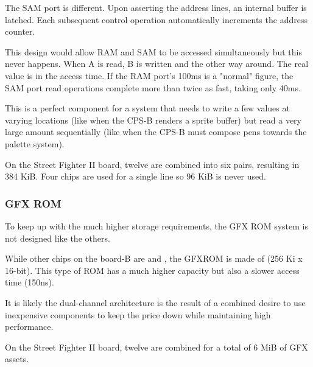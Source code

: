 The SAM port is different. Upon asserting the address lines, an internal buffer is latched. Each subsequent control operation automatically increments the address counter.

This design would allow RAM and SAM to be accessed simultaneously but this never happens. When A is read, B is written and the other way around. The real value is in the access time. If the RAM port's 100ms is a "normal" figure, the SAM port read operations complete more than twice as fast, taking only 40ms. 

 This is a perfect component for a system that needs to write a few values at varying locations (like when the CPS-B renders a sprite buffer) but read a very large amount sequentially (like when the CPS-B must compose pens towards the palette system).

 On the Street Fighter II board, twelve  are combined into six pairs, resulting in 384 KiB. Four chips are used for a single line so 96 KiB is never used.







\subsubsection{GFX ROM}
To keep up with the much higher storage requirements, the GFX ROM system is not designed like the others. 

While other chips on the board-B are  and , the GFXROM is made of  (256 Ki x 16-bit). This type of ROM has a much higher capacity but also a slower access time (150ns). 

It is likely the dual-channel architecture is the result of a combined desire to use inexpensive components to keep the price down while maintaining high performance.



On the Street Fighter II board, twelve  are combined for a total of 6 MiB of GFX assets.

